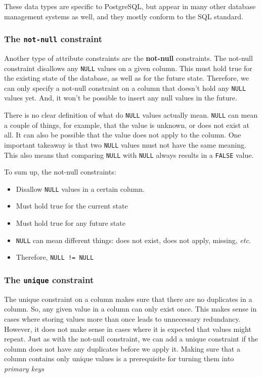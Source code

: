 \documentclass[11pt]{article}
\begin{document}
    These data types are specific to PostgreSQL, but appear in many other database management systems as well, and they mostly conform to the SQL standard.

    \subsubsection{The \texttt{not-null} constraint} \label{subsubsec:not_null}

    Another type of attribute constraints are the \textbf{not-null} constraints.
    The not-null constraint disallows any \texttt{NULL} values on a given column.
    This must hold true for the existing state of the database, as well as for the future state.
    Therefore, we can only specify a not-null constraint on a column that doesn't hold any \texttt{NULL} values yet.
    And, it won't be possible to insert any null values in the future.

    There is no clear definition of what do \texttt{NULL} values actually mean.
    \texttt{NULL} can mean a couple of things, for example, that the value is unknown, or does not exist at all.
    It can also be possible that the value does not apply to the column.
    One important takeaway is that two \texttt{NULL} values must not have the same meaning.
    This also means that comparing \texttt{NULL} with \texttt{NULL} always results in a \texttt{FALSE} value.

    To sum up, the not-null constraints:

    \begin{itemize}
        \item Disallow \texttt{NULL} values in a certain column.
        \item Must hold true for the current state
        \item Must hold true for any future state
        \item \texttt{NULL} can mean different things: does not exist, does not apply, missing, \textit{etc.}
        \item Therefore, \texttt{NULL~!=~NULL}
    \end{itemize}

    \subsubsection{The \texttt{unique} constraint} \label{subsubsec:unique}

    The unique constraint on a column makes sure that there are no duplicates in a column.
    So, any given value in a column can only exist once.
    This makes sense in cases where storing values more than once leads to unnecessary redundancy.
    However, it does not make sense in cases where it is expected that values might repeat.
    Just as with the not-null constraint, we can add a unique constraint if the column does not have any duplicates before we apply it.
    Making sure that a column contains only unique values is a prerequisite for turning them into \textit{primary keys}
\end{document}
